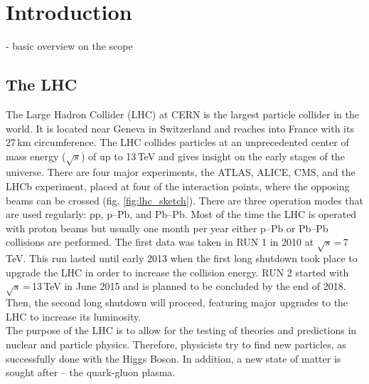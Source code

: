\chapter{Introduction}
- basic overview on the scope
\section{The LHC}
The Large Hadron Collider (LHC) at CERN is the largest particle collider in the world. It is located near Geneva in Switzerland and reaches into France with its 27\,km circumference. The LHC collides particles at an unprecedented center of mass energy ($\sqrt{s}$) of up to 13\,TeV and gives insight on the early stages of the universe. There are four major experiments, the ATLAS, ALICE, CMS, and the LHCb experiment, placed at four of the interaction points, where the opposing beams can be crossed (fig. \ref{fig:lhc_sketch}). There are three operation modes that are used regularly: pp, p--Pb, and Pb--Pb. Most of the time the LHC is operated with proton beams but usually one month per year either p--Pb or Pb--Pb collisions are performed. The first data was taken in RUN 1 in 2010 at $\sqrt{s}$\,=\,7\,TeV. This run lasted until early 2013 when the first long shutdown took place to upgrade the LHC in order to increase the collision energy. RUN 2 started with $\sqrt{s}$\,=\,13\,TeV in June 2015 and is planned to be concluded by the end of 2018. Then, the second long shutdown will proceed, featuring major upgrades to the LHC to increase its luminosity.\\
The purpose of the LHC is to allow for the testing of theories and predictions in nuclear and particle physics. Therefore, physicists try to find new particles, as successfully done with the Higgs Boson. In addition, a new state of matter is sought after -- the quark-gluon plasma. 

